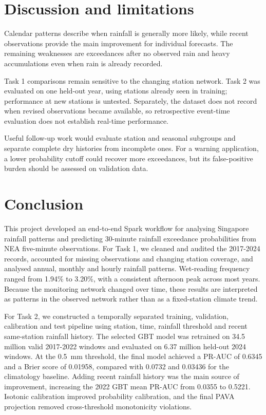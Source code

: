\documentclass[11pt,a4paper]{article}
\begin{document}
\section{Discussion and limitations}
Calendar patterns describe when rainfall is generally more likely, while
recent observations provide the main improvement for individual forecasts.
The remaining weaknesses are exceedances after no observed rain and heavy
accumulations even when rain is already recorded.

Task 1 comparisons remain sensitive to the changing station network.
Task 2 was evaluated on one held-out year, using stations already seen in
training; performance at new stations is untested. Separately, the dataset
does not record when revised observations became available, so retrospective
event-time evaluation does not establish real-time performance.

Useful follow-up work would evaluate station and seasonal subgroups and
separate complete dry histories from incomplete ones. For a warning
application, a lower probability cutoff could recover more exceedances,
but its false-positive burden should be assessed on validation data.

\section{Conclusion}
This project developed an end-to-end Spark workflow for analysing Singapore
rainfall patterns and predicting 30-minute rainfall exceedance probabilities
from NEA five-minute observations. For Task 1, we cleaned and audited the
2017-2024 records, accounted for missing observations and changing station
coverage, and analysed annual, monthly and hourly rainfall patterns.
Wet-reading frequency ranged from 1.94\% to 3.20\%, with a consistent
afternoon peak across most years. Because the monitoring network changed over
time, these results are interpreted as patterns in the observed network
rather than as a fixed-station climate trend.

For Task 2, we constructed a temporally separated training, validation,
calibration and test pipeline using station, time, rainfall threshold and
recent same-station rainfall history. The selected GBT model was retrained on
34.5 million valid 2017-2022 windows and evaluated on 6.37 million held-out
2024 windows. At the 0.5~mm threshold, the final model achieved a PR-AUC of
0.6345 and a Brier score of 0.01958, compared with 0.0732 and 0.03436 for the
climatology baseline. Adding recent rainfall history was the main source of
improvement, increasing the 2022 GBT mean PR-AUC from 0.0355 to 0.5221.
Isotonic calibration improved probability calibration, and the final PAVA
projection removed cross-threshold monotonicity violations.
\end{document}
